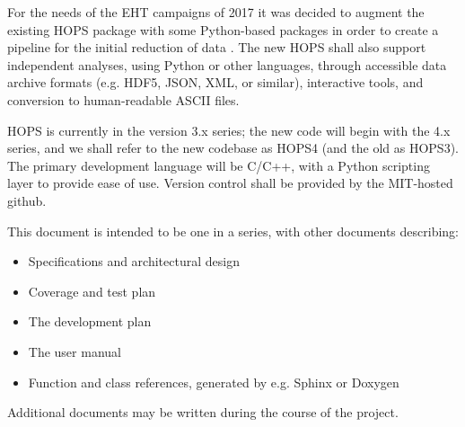 
For the needs of the \acs{EHT} campaigns of 2017 it was decided to augment
the existing HOPS package with some Python-based packages in order to
create a pipeline for the initial reduction of data \cite{blackburn2019eht}.
The new \ac{HOPS} shall also
support independent analyses, using Python or other languages, through
accessible data archive formats (e.g. HDF5, JSON, XML, or similar), interactive 
tools, and conversion to human-readable ASCII files. 

\acs{HOPS} is currently in the version 3.x series; the new code will
begin with the 4.x series, and we shall refer to the new codebase as HOPS4
(and the old as HOPS3). The primary development language will be C/C++, 
with a Python scripting layer to provide ease of use. Version control shall be 
provided by the MIT-hosted github. 









This document is intended to be one in a series, with other documents
describing:
\begin{itemize}
\item Specifications and architectural design \cite{design}
\item Coverage and test plan \cite{cover}
\item The development plan \cite{develop}
\item The user manual
\item Function and class references, generated by e.g. Sphinx or Doxygen
\end{itemize}
Additional documents may be written during the course of the project.



%
%
